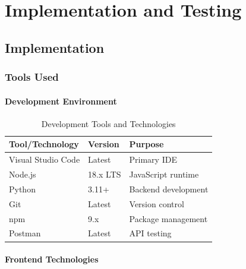 
\chapter{Implementation and Testing}

\section{Implementation}

\subsection{Tools Used}

\subsubsection{Development Environment}

\begin{table}[H]
\centering
\caption{Development Tools and Technologies}
\label{tab:tools}
\begin{tabular}{|p{4cm}|p{3cm}|p{6cm}|}
\hline
\textbf{Tool/Technology} & \textbf{Version} & \textbf{Purpose} \\
\hline
Visual Studio Code & Latest & Primary IDE \\
\hline
Node.js & 18.x LTS & JavaScript runtime \\
\hline
Python & 3.11+ & Backend development \\
\hline
Git & Latest & Version control \\
\hline
npm & 9.x & Package management \\
\hline
Postman & Latest & API testing \\
\hline
\end{tabular}
\end{table}

\subsubsection{Frontend Technologies}

